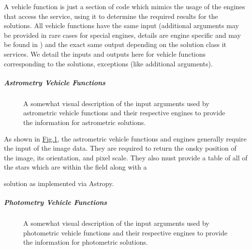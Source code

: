 \documentclass[letterpaper,11pt,english]{sphinxmanual}
\begin{document}
\sphinxAtStartPar
A vehicle function is just a section of code which mimics the usage of the
engines that access the service, using it to determine the required results
for the solutions. All vehicle functions have the same input (additional
arguments may be provided in rare cases for special engines, details are
engine specific and may be found in
{\hyperref[\detokenize{technical/architecture/services_engines:technical-architecture-services-engines}]{}}) and the exact same output
depending on the solution class it services. We detail the inputs
and outputs here for vehicle functions corresponding to the solutions,
exceptions (like additional arguments).


\subparagraph{Astrometry Vehicle Functions}
\label{\detokenize{technical/architecture/vehicles_solutions:astrometry-vehicle-functions}}
\begin{figure}[H]
\centering
\capstart

\noindent{}
\caption{A somewhat visual description of the input arguments used by
astrometric vehicle functions and their respective engines to
provide the information for astrometric solutions.}\label{\detokenize{technical/architecture/vehicles_solutions:id1}}\label{\detokenize{technical/architecture/vehicles_solutions:figure-vehicle-function-astrometry}}\end{figure}

\sphinxAtStartPar
As shown in \hyperref[\detokenize{technical/architecture/vehicles_solutions:figure-vehicle-function-astrometry}]{Fig.\@ \ref{\detokenize{technical/architecture/vehicles_solutions:figure-vehicle-function-astrometry}}}, the astrometric
vehicle functions and engines generally require the input of the image data.
They are required to return the on\sphinxhyphen{}sky position of the image, its orientation,
and pixel scale. They also must provide a table of all of the stars which are
within the field along with a
%
\begin{footnote}[50]\sphinxAtStartFootnote
{}
%
\end{footnote}
solution as implemented via Astropy.


\subparagraph{Photometry Vehicle Functions}
\label{\detokenize{technical/architecture/vehicles_solutions:photometry-vehicle-functions}}
\begin{figure}[H]
\centering
\capstart

\noindent{}
\caption{A somewhat visual description of the input arguments used by
photometric vehicle functions and their respective engines to
provide the information for photometric solutions.}\label{\detokenize{technical/architecture/vehicles_solutions:id2}}\label{\detokenize{technical/architecture/vehicles_solutions:figure-vehicle-function-photometry}}\end{figure}
\end{document}
